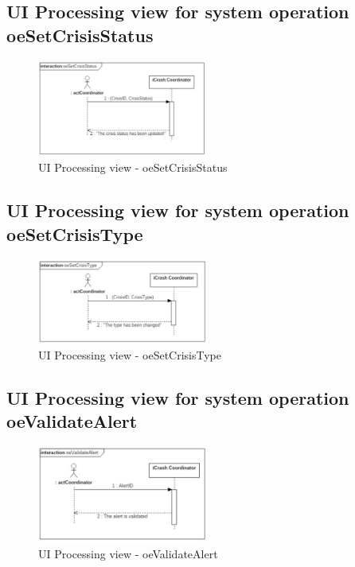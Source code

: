 \subsection{UI Processing view for system operation oeSetCrisisStatus}

\begin{figure}[h]
	\centering	
	\captionsetup{justification=centering}
	\includegraphics[width=0.5\textwidth]{./images/ui_oeSetCrisisStatus.eps}
	\caption{UI Processing view - oeSetCrisisStatus}
\end{figure}


\subsection{UI Processing view for system operation oeSetCrisisType}

\begin{figure}[h]
	\centering	
	\captionsetup{justification=centering}
	\includegraphics[width=0.5\textwidth]{./images/ui_oeSetCrisisType.eps}
	\caption{UI Processing view - oeSetCrisisType}
\end{figure}


\subsection{UI Processing view for system operation oeValidateAlert}

\begin{figure}[h]
	\centering	
	\captionsetup{justification=centering}
	\includegraphics[width=0.5\textwidth]{./images/ui_oeValidateAlert.eps}
	\caption{UI Processing view - oeValidateAlert}
\end{figure}



